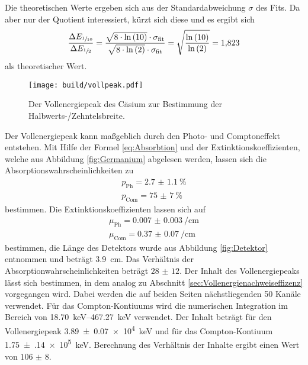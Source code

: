 Die theoretischen Werte ergeben sich aus der Standardabweichung $\sigma$ des Fits. Da aber nur der Quotient interessiert, 
kürzt sich diese und es ergibt sich
\begin{equation}
  \frac{\Delta E_{\sfrac{1}{10}}}{\Delta E_{\sfrac{1}{2}}} = \frac{\sqrt{8 \cdot \ln{(10)}} \cdot \sigma_\text{fit}}{\sqrt{8 \cdot \ln{(2)}} \cdot \sigma_\text{fit}} = \sqrt{\frac{\ln{(10)}}{\ln{(2)}}} = \num{1.823}
\end{equation}
als theoretischer Wert.
\begin{figure}[htb]
 \centering
 \texttt{[image: build/vollpeak.pdf]}
 \caption{Der Vollenergiepeak des Cäsium zur Bestimmung der Halbwerts-/Zehntelsbreite.}
 \label{fig:Halb}
\end{figure}

Der Vollenergiepeak kann maßgeblich durch den Photo- und Comptoneffekt entstehen. Mit Hilfe der Formel \ref{eq:Absorbtion} und 
der Extinktionskoeffizienten, welche aus Abbildung \ref{fig:Germanium} abgelesen werden, lassen sich die Absorptionswahrscheinlichkeiten
zu
\begin{align*}
  p_\text{Ph} = \SI{2.7(11)}{\percent} \\
  p_\text{Com} = \SI{75(7)}{\percent}
\end{align*}
bestimmen.
Die Extinktionskoeffizienten lassen sich auf 
\begin{gather*}
  \mu_\text{Ph} = \SI{0.007(3)}{\per\centi\meter} \\
  \mu_\text{Com} = \SI{0.37(7)}{\per\centi\meter}
\end{gather*}
bestimmen, die Länge des Detektors wurde aus Abbildung \ref{fig:Detektor} entnommen und beträgt \SI{3.9}{\centi\meter}.
Das Verhältnis der Absorptionwahrscheinlichkeiten beträgt $\num{28(12)}$.
Der Inhalt des Vollenergiepeaks lässt sich bestimmen, in dem analog zu Abschnitt \ref{sec:Vollenergienachweiseffizenz} 
vorgegangen wird. Dabei werden die auf beiden Seiten nächstliegenden \num{50} Kanäle verwendet.
Für das Compton-Kontiuums wird die numerischen Integration im Bereich von
\SIrange{18.70}{467.27}{\kilo\electronvolt} verwendet. Der Inhalt beträgt für den
Vollenergiepeak \SI{3.89(7)e4}{\kilo\electronvolt} und für das Compton-Kontiuum \SI{1.75(14)e5}{\kilo\electronvolt}. 
Berechnung des Verhältnis der Inhalte ergibt einen Wert von $\num{106(8)}$.
\FloatBarrier

